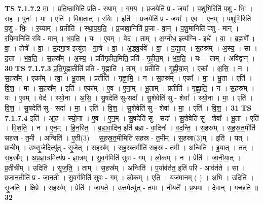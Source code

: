 \documentclass[17pt]{extarticle}
\begin{document}
                  \newline
                                \textbf{ TS 7.1.7.2} \newline
                  मा॒ । प्र॒ति॒ष्ठामिति॑ प्रति - स्थाम् । ग॒म॒य॒ । प्र॒जयेति॑ प्र - जया᳚ । प॒शुभि॒रिति॑ प॒शु - भिः॒ । स॒ह । पुनः॑ । मा॒ । एति॑ । वि॒श॒ता॒त् । र॒यिः । इति॑ । प्र॒जयेति॑ प्र - जया᳚ । ए॒व । ए॒न॒म् । प॒शुभि॒रिति॑ प॒शु - भिः॒ । र॒य्याम् । प्रतीति॑ । स्था॒प॒य॒ति॒ । प्र॒जावा॒निति॑ प्र॒जा - वा॒न् । प॒शु॒मानिति॑ पशु - मान् । र॒यि॒मानिति॑ रयि - मान् । भ॒व॒ति॒ । यः । ए॒वम् । वेद॑ । ताम् । अ॒ग्नीध॒ इत्य॑ग्नि - इधे᳚ । वा॒ । ब्र॒ह्मणे᳚ । वा॒ । होत्रे᳚ । वा॒ । उ॒द्गा॒त्र इत्यु॑त् - गा॒त्रे । वा॒ । अ॒द्ध्व॒र्यवे᳚ । वा॒ । द॒द्या॒त् । स॒हस्र᳚म् । अ॒स्य॒ । सा । द॒त्ता । भ॒व॒ति॒ । स॒हस्र᳚म् । अ॒स्य॒ । प्रति॑गृहीत॒मिति॒ प्रति॑ - गृ॒ही॒त॒म् । भ॒व॒ति॒ । यः । ताम् । अवि॑द्वान् । \textbf{  30} \newline
                  \newline
                                \textbf{ TS 7.1.7.3} \newline
                  प्र॒ति॒गृ॒ह्णातीति॑ प्रति - गृ॒ह्णाति॑ । ताम् । प्रतीति॑ । गृ॒ह्णी॒या॒त् । एका᳚ । अ॒सि॒ । न । स॒हस्र᳚म् । एका᳚म् । त्वा॒ । भू॒ताम् । प्रतीति॑ । गृ॒ह्णा॒मि॒ । न । स॒हस्र᳚म् । एका᳚ । मा॒ । भू॒ता । एति॑ । वि॒श॒ । मा । स॒हस्र᳚म् । इति॑ । एका᳚म् । ए॒व । ए॒ना॒म् । भू॒ताम् । प्रतीति॑ । गृ॒ह्णा॒ति॒ । न । स॒हस्र᳚म् । यः । ए॒वम् । वेद॑ । स्यो॒ना । अ॒सि॒ । सु॒षदेति॑ सु-सदा᳚ । सु॒शेवेति॑ सु - शेवा᳚ । स्यो॒ना । मा॒ । एति॑ । वि॒श॒ । सु॒षदेति॑ सु - सदा᳚ । मा॒ । एति॑ । वि॒श॒ । सु॒शेवेति॑ सु - शेवा᳚ । मा॒ । एति॑ । वि॒श॒ । \textbf{  31} \newline
                  \newline
                                \textbf{ TS 7.1.7.4} \newline
                  इति॑ । आ॒ह॒ । स्यो॒ना । ए॒व । ए॒न॒म् । सु॒षदेति॑ सु - सदा᳚ । सु॒शेवेति॑ सु - शेवा᳚ । भू॒ता । एति॑ । वि॒श॒ति॒ । न । ए॒न॒म् । हि॒न॒स्ति॒ । ब्र॒ह्म॒वा॒दिन॒ इति॑ ब्रह्म - वा॒दिनः॑ । व॒द॒न्ति॒ । स॒हस्र᳚म् । स॒ह॒स्र॒त॒मीति॑ सहस्र - त॒मी । अन्विति॑ । ए॒ती(3) । स॒ह॒स्र॒त॒मीमिति॑ सहस्र - त॒मीम् । स॒हस्रा(3)म् । इति॑ । यत् । प्राची᳚म् । उ॒थ्सृ॒जेदित्यु॑त् - सृ॒जेत् । स॒हस्र᳚म् । स॒ह॒स्र॒त॒मीति॑ सहस्र - त॒मी । अन्विति॑ । इ॒या॒त् । तत् । स॒हस्र᳚म् । अ॒प्र॒ज्ञा॒त्रमित्य॑प्र - ज्ञा॒त्रम् । सु॒व॒र्गमिति॑ सुवः - गम् । लो॒कम् । न । प्रेति॑ । जा॒नी॒या॒त् । प्र॒तीची᳚म् । उदिति॑ । सृ॒ज॒ति॒ । ताम् । स॒हस्र᳚म् । अन्विति॑ । प॒र्याव॑र्तत॒ इति॑ परि - आव॑र्तते । सा । प्र॒जा॒न॒तीति॑ प्र - जा॒न॒ती । सु॒व॒र्गमिति॑ सुवः - गम् । लो॒कम् । ए॒ति॒ । यज॑मानम् ( ) । अ॒भि । उदिति॑ । सृ॒ज॒ति॒ । क्षि॒प्रे । स॒हस्र᳚म् । प्रेति॑ । जा॒य॒ते॒ । उ॒त्त॒मेत्यु॑त् - त॒मा । नी॒यते᳚ । प्र॒थ॒मा । दे॒वान् । ग॒च्छ॒ति॒ ॥ \textbf{  32} \newline
\end{document}
